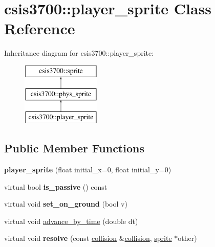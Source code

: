 \hypertarget{classcsis3700_1_1player__sprite}{}\section{csis3700\+:\+:player\+\_\+sprite Class Reference}
\label{classcsis3700_1_1player__sprite}
Inheritance diagram for csis3700\+:\+:player\+\_\+sprite\+:\begin{figure}[H]
\begin{center}
\leavevmode
\includegraphics[height=3.000000cm]{classcsis3700_1_1player__sprite}
\end{center}
\end{figure}
\subsection*{Public Member Functions}
\begin{DoxyCompactItemize}
\item 
\mbox{\label{classcsis3700_1_1player__sprite_ac187a629d01d5499a19a96e10c132aab}} 
{\bfseries player\+\_\+sprite} (float initial\+\_\+x=0, float initial\+\_\+y=0)
\item 
\mbox{\label{classcsis3700_1_1player__sprite_a4d58637b044853739e75f0e329cb8d67}} 
virtual bool {\bfseries is\+\_\+passive} () const
\item 
\mbox{\label{classcsis3700_1_1player__sprite_a2fc12d698304e7db48bee063e2cde2be}} 
virtual void {\bfseries set\+\_\+on\+\_\+ground} (bool v)
\item 
virtual void \hyperlink{classcsis3700_1_1player__sprite_ac2453e0b3934ac639d704c4ecca7493d}{advance\+\_\+by\+\_\+time} (double dt)
\item 
\mbox{\label{classcsis3700_1_1player__sprite_a05d3409aa60e9eae24b696c9e9508b7a}} 
virtual void {\bfseries resolve} (const \hyperlink{classcsis3700_1_1collision}{collision} \&\hyperlink{classcsis3700_1_1collision}{collision}, \hyperlink{classcsis3700_1_1sprite}{sprite} $\ast$other)
\end{DoxyCompactItemize}
